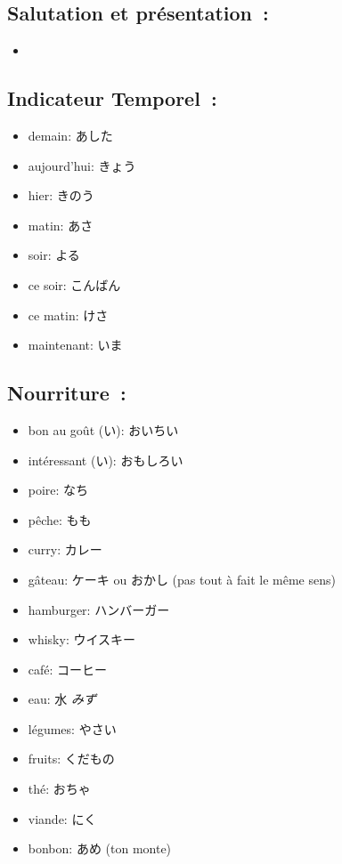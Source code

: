 \documentclass{article}
\begin{document}
\begin{CJK}{UTF8}{min}
   \subsection{Salutation et présentation~:}
   \begin{itemize}
       \item  
   \end{itemize}
    \subsection{Indicateur Temporel~:}
    \begin{itemize}
       \item demain: あした
        \item aujourd'hui: きょう
        \item hier: きのう
        \item matin: あさ
        \item soir: よる
        \item ce soir: こんばん
        \item ce matin: けさ
        \item maintenant: いま
   \end{itemize}
   \subsection{Nourriture~:}
   \begin{itemize}
        \item bon au goût (い): おいちい
        \item intéressant (い): おもしろい
       \item poire: なち
        \item pêche: もも
        \item curry: カレー
        \item gâteau: ケーキ ou おかし (pas tout à fait le même sens)
        \item hamburger: ハンバーガー    
        \item whisky: ウイスキー
        \item café: コーヒー
        \item eau: 水 \textit{みず}
        \item légumes: やさい
        \item fruits: くだもの
        \item thé: おちゃ
        \item viande: にく
        \item bonbon: あめ (ton monte)
   \end{itemize}

\end{CJK}
\end{document}
